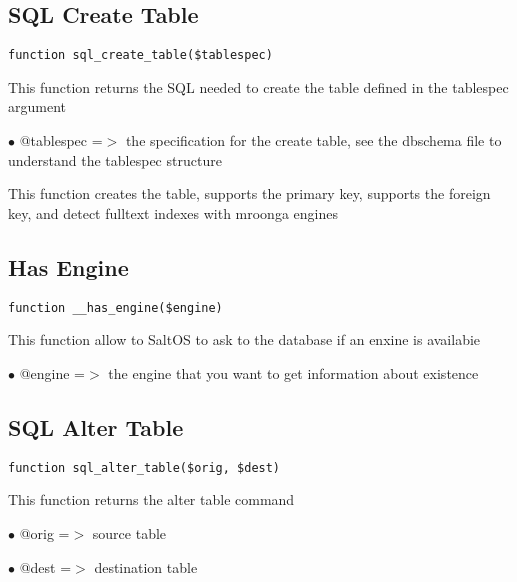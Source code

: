 \documentclass[a4paper]{book}
\begin{document}
\subsection{SQL Create Table}

\begin{lstlisting}
function sql_create_table($tablespec)
\end{lstlisting}

This function returns the SQL needed to create the table defined in the
tablespec argument

\begin{compactitem}
\item[\color{myblue}$\bullet$] @tablespec =$>$ the specification for the create table, see the dbschema
              file to understand the tablespec structure
\end{compactitem}

This function creates the table, supports the primary key, supports the
foreign key, and detect fulltext indexes with mroonga engines

\hypertarget{toc237}{}
\subsection{Has Engine}

\begin{lstlisting}
function __has_engine($engine)
\end{lstlisting}

This function allow to SaltOS to ask to the database if an enxine is
availabie

\begin{compactitem}
\item[\color{myblue}$\bullet$] @engine =$>$ the engine that you want to get information about existence
\end{compactitem}

\hypertarget{toc238}{}
\subsection{SQL Alter Table}

\begin{lstlisting}
function sql_alter_table($orig, $dest)
\end{lstlisting}

This function returns the alter table command

\begin{compactitem}
\item[\color{myblue}$\bullet$] @orig =$>$ source table
\item[\color{myblue}$\bullet$] @dest =$>$ destination table
\end{compactitem}
\end{document}
